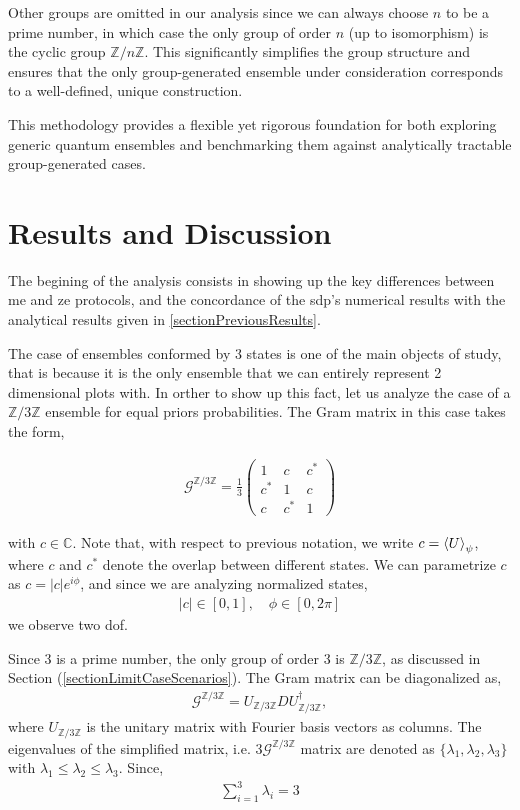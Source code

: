 \documentclass[12pt,letterpaper]{article}
\begin{document}
Other groups are omitted in our analysis since we can always choose $n$ to be a prime number, in which case the only group of order $n$ (up to isomorphism) is the cyclic group $\mathbb{Z}/n\mathbb{Z}$. This significantly simplifies the group structure and ensures that the only group-generated ensemble under consideration corresponds to a well-defined, unique construction.

This methodology provides a flexible yet rigorous foundation for both exploring generic quantum ensembles and benchmarking them against analytically tractable group-generated cases.

\newpage
\section{Results and Discussion}\label{sectionResultsAndDiscussion}

The begining of the analysis consists in showing up the key differences between \gls{me} and \gls{ze} protocols, and the concordance of the \gls{sdp}'s numerical results with the analytical results given in \ref{sectionPreviousResults}.

The case of ensembles conformed by 3 states is one of the main objects of study, that is because it is the only ensemble that we can entirely represent 2 dimensional plots with. In orther to show up this fact, let us analyze the case of a $\mathbb{Z}/3\mathbb{Z}$ ensemble for equal priors probabilities. The Gram matrix in this case takes the form,

\begin{align*}
	\mathcal{G}^{\mathbb{Z}/3\mathbb{Z}}=\frac{1}{3}\begin{pmatrix}
		1 & c & c^*\\
		c^* & 1 & c\\
		c & c^* & 1
	\end{pmatrix}
\end{align*}

with $c \in \mathbb{C}$. Note that, with respect to previous notation, we write $c = \braket{U}_{\psi}$, where $c$ and $c^*$ denote the overlap between different states. We can parametrize $c$ as $c = |c|e^{i\phi}$, and since we are analyzing normalized states,
\begin{align*}
	|c|\in [0,1], \quad \phi\in[0,2\pi]
\end{align*}
we observe two \gls{dof}.

Since 3 is a prime number, the only group of order 3 is $\mathbb{Z}/3\mathbb{Z}$, as discussed in Section (\ref{sectionLimitCaseScenarios}). The Gram matrix can be diagonalized as,
\begin{align*}
	\mathcal{G}^{\mathbb{Z}/3\mathbb{Z}} = U_{\mathbb{Z}/3\mathbb{Z}} D U_{\mathbb{Z}/3\mathbb{Z}}^\dagger,
\end{align*}
where $U_{\mathbb{Z}/3\mathbb{Z}}$ is the unitary matrix with Fourier basis vectors as columns. The eigenvalues of the simplified matrix, i.e. $3\mathcal{G}^{\mathbb{Z}/3\mathbb{Z}}$ matrix are denoted as $\{\lambda_1,\lambda_2,\lambda_3\}$ with $\lambda_1 \leq \lambda_2 \leq \lambda_3$. Since,
\begin{align*}
	\sum_{i=1}^3 \lambda_i = 3
\end{align*}
\end{document}
